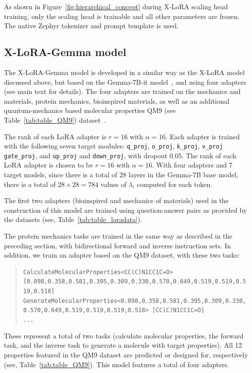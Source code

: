 As shown in Figure~\ref{fig:hierarchical_concept} during X-LoRA scaling head training, only the scaling head is trainable and all other parameters are frozen. The native Zephyr tokenizer and prompt template is used. 


\subsection{X-LoRA-Gemma model}
The X-LoRA-Gemma model is developed in a similar way as the X-LoRA model discussed above, but based on the Gemma-7B-it model~\cite{Google/gemma-7b-itFace}, and using four adapters (see main text for details). The four adapters are trained on the mechanics and materials, protein mechanics, bioinspired materials, as well as an additional quantum-mechanics based molecular properties QM9 (see Table~\ref{tab:table_QM9}) dataset~\cite{Ruddigkeit2012EnumerationGDB-17,Ramakrishnan2015ElectronicSpace}.

The rank of each LoRA adapter is $r=16$ with $\alpha=16$. Each adapter is trained with the following seven target  modules: \texttt{q\_proj}, \texttt{o\_proj}, \texttt{k\_proj}, \texttt{v\_proj} \texttt{gate\_proj}, and \texttt{up\_proj} and \texttt{down\_proj}, with dropout 0.05. The rank of each LoRA adapter is  chosen to be $r=16$ with $\alpha=16$. With four adapters and 7 target models, since there is a total of 28 layers in the Gemma-7B base model, there is a total of $28\times 28=784$ values of $\lambda_i$ computed for each token.


The first two adapters (bioinspired and mechanics of materials) used in the construction of this model are trained using question-answer pairs as provided by the datasets (see, Table~\ref{tab:table_loradata}). 

The protein mechanics tasks are trained in the same way as described in the preceding section, with bidirectional forward and inverse instruction sets. In addition, we train an adapter based on the QM9 dataset, with these two tasks:  
\begin{quote}
\tiny {\texttt{CalculateMolecularProperties<CC(C)N1CC1C=O> [0.098,0.358,0.581,0.395,0.309,0.330,0.570,0.649,0.519,0.519,0.519,0.518]\\
GenerateMolecularProperties<0.098,0.358,0.581,0.395,0.309,0.330,0.570,0.649,0.519,0.519,0.519,0.518> [CC(C)N1CC1C=O]\\ 
...
}}
\end{quote}
These represent a total of two tasks (calculate molecular properties, the forward task, and the inverse task to generate a molecule with target properties). All 12 properties featured in the QM9 dataset are predicted or designed for, respectively (see, Table~\ref{tab:table_QM9}). 
This model features a total of four adapters. 


